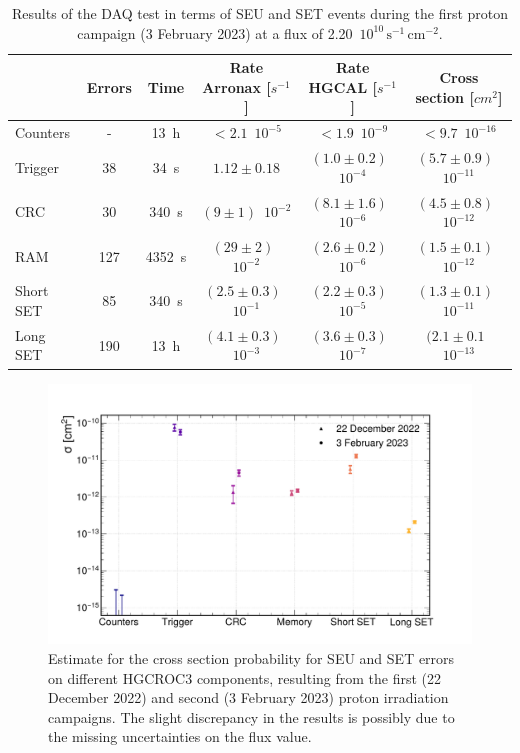 \begin{table}
    \centering
    \begin{tabular}{ l | c | c | c | c | c }
        \hline
        \hline
        & Errors & Time & Rate Arronax [$s^{-1}$] & Rate HGCAL [$s^{-1}$] & Cross section [$cm^{2}$]\\
        \hline
        Counters & - & 13~h & $<2.1$~$10^{-5}$ & $<1.9$~$10^{-9}$ & $<9.7$~$10^{-16}$\\
        Trigger & 38 & 34~s & $1.12\pm0.18$ & $(1.0\pm0.2)$~$10^{-4}$ & $(5.7\pm0.9)$~$10^{-11}$ \\
        CRC & 30 & 340~s & $(9\pm1)$~$10^{-2}$ & $(8.1\pm1.6)$~$10^{-6}$ & $(4.5\pm0.8)$~$10^{-12}$\\
        RAM & 127 & 4352~s & $(29\pm2)$~$10^{-2}$ & $(2.6\pm0.2)$~$10^{-6}$ & $(1.5\pm0.1)$~$10^{-12}$\\
        Short SET & 85 & 340~s & $(2.5\pm0.3)$~$10^{-1}$ & $(2.2\pm0.3)$~$10^{-5}$ & $(1.3\pm0.1)$~$10^{-11}$ \\
        Long SET & 190 & 13~h & $(4.1\pm0.3)$~$10^{-3}$ & $(3.6\pm0.3)$~$10^{-7}$ & $(2.1\pm0.1$~$10^{-13}$ \\
        \hline
        \hline
    \end{tabular}
    \caption{Results of the DAQ test in terms of SEU and SET events during the first proton campaign (3 February 2023) at a flux of 2.20~$10^{10}\,\textrm{s}^{-1}\,\textrm{cm}^{-2}$.}
    \label{tab:SEE_protons2}
\end{table}

\begin{figure}
    \centering
    \includegraphics[width=0.7\linewidth]{Figures/HGCAL/SEE_CrossSection.pdf}
    \caption{Estimate for the cross section probability for SEU and SET errors on different HGCROC3 components, resulting from the first (22 December 2022) and second (3 February 2023) proton irradiation campaigns. The slight discrepancy in the results is possibly due to the missing uncertainties on the flux value.}
    \label{fig:SEE_CrossSection}
\end{figure}

